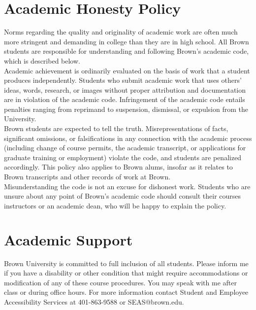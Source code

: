 \documentclass[11pt]{article}
\begin{document}
\section*{Academic Honesty Policy}
Norms regarding the quality and originality of academic work are often much more stringent and demanding in college than they are in high school. All Brown students are responsible for understanding and following Brown’s academic code, which is described below. \\

Academic achievement is ordinarily evaluated on the basis of work that a student produces independently. Students who submit academic work that uses others’ ideas, words, research, or images without proper attribution and documentation are in violation of the academic code. Infringement of the academic code entails penalties ranging from reprimand to suspension, dismissal, or expulsion from the University. \\

Brown students are expected to tell the truth. Misrepresentations of facts, significant omissions, or falsifications in any connection with the academic process (including change of course permits, the academic transcript, or applications for graduate training or employment) violate the code, and students are penalized accordingly. This policy also applies to Brown alums, insofar as it relates to Brown transcripts and other records of work at Brown. \\

Misunderstanding the code is not an excuse for dishonest work. Students who are unsure about any point of Brown’s academic code should consult their courses instructors or an academic dean, who will be happy to explain the policy.

\section*{Academic Support}
Brown University is committed to full inclusion of all students.  Please inform me if you have a disability or other condition that might require accommodations or modification of any of these course procedures. You may speak with me after class or during office hours. For more information contact Student and Employee Accessibility Services at 401-863-9588 or SEAS@brown.edu.
\end{document}
